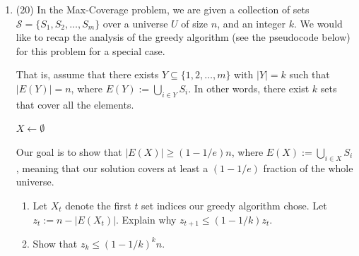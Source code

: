 \documentclass[letterpaper,12pt]{article}
\begin{document}
\begin{enumerate}
Briefly explain why we hire the best secretary with probability at least $\lambda(1 - \lambda)$. Here, we assume that $n$ is sufficiently large and $\lambda \in (0, 1)$ is a constant.



\textbf{solution}

the actual probability is all combinations of successes, but one combination of success is where the second best candidate appears in the first \(\lambda\) percent of the candidates and the best is in the \(1-\lambda\) percent. the probability of this outcome is \(\lambda(1 - \lambda)\) as n goes to infinity, thus the probability is at least this value. 


\newpage

\item (20) In the Max-Coverage problem, we are given a collection of sets $\mathcal{S} = \{S_1, S_2, \dots, S_m\}$ over a universe $U$ of size $n$, and an integer $k$. We would like to recap the analysis of the greedy algorithm (see the pseudocode below) for this problem for a special case. 

That is, assume that there exists $Y \subseteq \{1, 2, \ldots, m\}$ with $|Y| = k$ such that $|E(Y)| = n$, where $E(Y) := \bigcup_{i \in Y} S_i$. In other words, there exist $k$ sets that cover all the elements.


\begin{algorithm}[H]
\SetAlgoLined
{}

 $X \gets \emptyset$\;
 \;
 \caption{Greedy Maximum Coverage}
\end{algorithm}

Our goal is to show that $|E(X)| \geq (1 - 1/e) n$, where $E(X) := \bigcup_{i \in X} S_i$, meaning that our solution covers at least a $(1 - 1/e)$ fraction of the whole universe.

\begin{enumerate}
    \item Let $X_t$ denote the first $t$ set indices our greedy algorithm chose. Let $z_t := n - |E(X_t)|$. Explain why $z_{t+1} \leq (1 - 1/ k) z_t$.
    
    \item Show that $z_k \leq (1 - 1/ k)^k n$.
    

\end{enumerate}
\end{enumerate}
\end{document}
